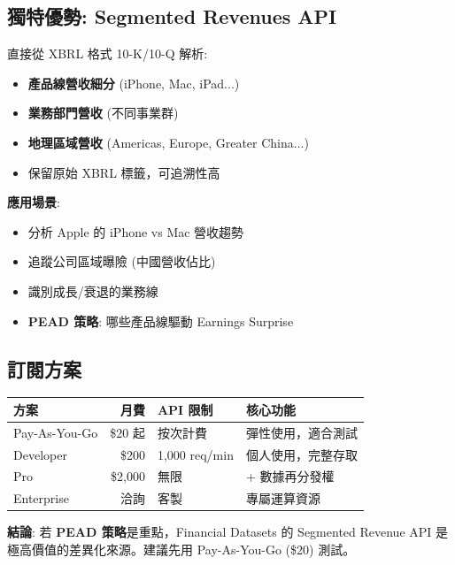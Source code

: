 \documentclass[11pt,a4paper]{article}
\begin{document}
\subsection{獨特優勢: Segmented Revenues API}

\begin{tcolorbox}[colback=fdsblue!5,colframe=fdsblue,title={其他 API 少見的功能}]
直接從 XBRL 格式 10-K/10-Q 解析:
\begin{itemize}[leftmargin=*]
    \item \textbf{產品線營收細分} (iPhone, Mac, iPad...)
    \item \textbf{業務部門營收} (不同事業群)
    \item \textbf{地理區域營收} (Americas, Europe, Greater China...)
    \item 保留原始 XBRL 標籤，可追溯性高
\end{itemize}
\end{tcolorbox}

\textbf{應用場景}:
\begin{itemize}
    \item 分析 Apple 的 iPhone vs Mac 營收趨勢
    \item 追蹤公司區域曝險 (中國營收佔比)
    \item 識別成長/衰退的業務線
    \item \textbf{PEAD 策略}: 哪些產品線驅動 Earnings Surprise
\end{itemize}

\subsection{訂閱方案}

\begin{table}[H]
\centering
\begin{tabular}{@{}lrll@{}}
\toprule
\textbf{方案} & \textbf{月費} & \textbf{API 限制} & \textbf{核心功能} \\
\midrule
Pay-As-You-Go & \$20 起 & 按次計費 & 彈性使用，適合測試 \\
Developer & \$200 & 1,000 req/min & 個人使用，完整存取 \\
Pro & \$2,000 & 無限 & + 數據再分發權 \\
Enterprise & 洽詢 & 客製 & 專屬運算資源 \\
\bottomrule
\end{tabular}
\end{table}

\textbf{結論}: 若 \textbf{PEAD 策略}是重點，Financial Datasets 的 Segmented Revenue API 是極高價值的差異化來源。建議先用 Pay-As-You-Go (\$20) 測試。
\end{document}

